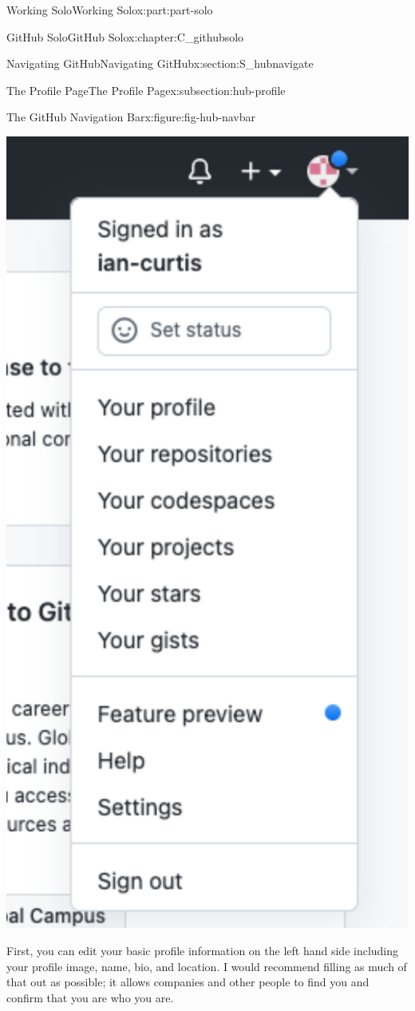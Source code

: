 \documentclass[oneside,10pt,]{book}
\begin{document}
\begin{partptx}{Working Solo}{}{Working Solo}{}{}{x:part:part-solo}
\begin{chapterptx}{GitHub Solo}{}{GitHub Solo}{}{}{x:chapter:C_githubsolo}
\begin{sectionptx}{Navigating GitHub}{}{Navigating GitHub}{}{}{x:section:S_hubnavigate}
\begin{subsectionptx}{The Profile Page}{}{The Profile Page}{}{}{x:subsection:hub-profile}
\begin{figureptx}{The GitHub Navigation Bar}{x:figure:fig-hub-navbar}{}
\begin{image}{0.35}{0.3}{0.35}
\includegraphics[width=\linewidth]{external/hub_navbar.pdf}
\end{image}%
\tcblower
\end{figureptx}%
First, you can edit your basic profile information on the left hand side including your profile image, name, bio, and location. I would recommend filling as much of that out as possible; it allows companies and other people to find you and confirm that you are who you are.%

\end{subsectionptx}
\end{sectionptx}
\end{chapterptx}
\end{partptx}
\end{document}
